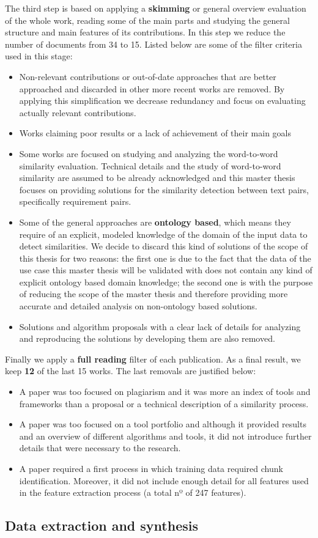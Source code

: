The third step is based on applying a \textbf{skimming} or general overview evaluation of the whole work, reading some of the main parts and studying the general structure and main features of its contributions. In this step we reduce the number of documents from 34 to 15. Listed below are some of the filter criteria used in this stage:
\begin{itemize}
\item Non-relevant contributions or out-of-date approaches that are better approached and discarded in other more recent works are removed. By applying this simplification we decrease redundancy and focus on evaluating actually relevant contributions.
\item Works claiming poor results or a lack of achievement of their main goals
\item Some works are focused on studying and analyzing the word-to-word similarity evaluation. Technical details and the study of word-to-word similarity are assumed to be already acknowledged and this master thesis focuses on providing solutions for the similarity detection between text pairs, specifically requirement pairs.
\item Some of the general approaches are \textbf{ontology based}, which means they require of an explicit, modeled knowledge of the domain of the input data to detect similarities. We decide to discard this kind of solutions of the scope of this thesis for two reasons: the first one is due to the fact that the data of the use case this master thesis will be validated with does not contain any kind of explicit ontology based domain knowledge; the second one is with the purpose of reducing the scope of the master thesis and therefore providing more accurate and detailed analysis on non-ontology based solutions.
\item Solutions and algorithm proposals with a clear lack of details for analyzing and reproducing the solutions by developing them are also removed.
\end{itemize}
Finally we apply a \textbf{full reading} filter of each publication. As a final result, we keep \textbf{12} of the last 15 works. The last removals are justified below:
\begin{itemize}
\item A paper was too focused on plagiarism and it was more an index of tools and frameworks than a proposal or a technical description of a similarity process.
\item A paper was too focused on a tool portfolio and although it provided results and an overview of different algorithms and tools, it did not introduce further details that were necessary to the research.
\item A paper required a first process in which training data required chunk identification. Moreover, it did not include enough detail for all features used in the feature extraction process (a total nº of 247 features).
\end{itemize}

\subsection{Data extraction and synthesis}

